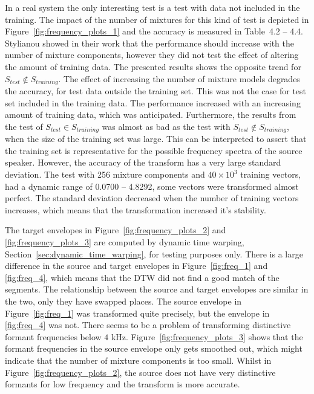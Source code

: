 In a real system the only interesting test is a test with data not included in the training. The impact of the number of mixtures for this kind of test is depicted in Figure~\ref{fig:frequency_plots_1} and the accuracy is measured in Table~4.2 -- 4.4. Stylianou \etal \cite{stylianou98} showed in their work that the performance should increase with the number of mixture components, however they did not test the effect of altering the amount of training data. The presented results shows the opposite trend for $S_{test}\notin S_{training}$. The effect of increasing the number of mixture models degrades the accuracy, for test data outside the training set. This was not the case for test set included in the training data. The performance increased with an increasing amount of training data, which was anticipated. Furthermore, the results from the test of $S_{test}\in S_{training}$ was almost as bad as the test with $S_{test}\notin S_{training}$, when the size of the training set was large. This can be interpreted to assert that the training set is representative for the possible frequency spectra of the source speaker. However, the accuracy of the transform has a very large standard deviation. The test with 256 mixture components and $40\times 10^3$ training vectors, had a dynamic range of 0.0700 -- 4.8292, \ie some vectors were transformed almost perfect. The standard deviation decreased when the number of training vectors increases, which means that the transformation increased it's stability. 

The target envelopes in Figure~\ref{fig:frequency_plots_2} and \ref{fig:frequency_plots_3} are computed by dynamic time warping, Section~\ref{sec:dynamic_time_warping}, for testing purposes only. There is a large difference in the source and target envelopes in Figure~\ref{fig:freq_1} and \ref{fig:freq_4}, which means that the DTW did not find a good match of the segments. The relationship between the source and target envelopes are similar in the two, only they have swapped places. The source envelope in Figure~\ref{fig:freq_1} was transformed quite precisely, but the envelope in \ref{fig:freq_4} was not. There seems to be a problem of transforming distinctive formant frequencies below $4$ kHz. Figure~\ref{fig:frequency_plots_3} shows that the formant frequencies in the source envelope only gets smoothed out, which might indicate that the number of mixture components is too small. Whilst in Figure~\ref{fig:frequency_plots_2}, the source does not have very distinctive formants for low frequency and the transform is more accurate.

